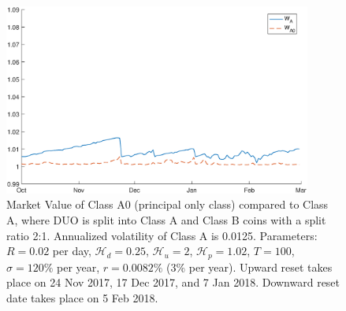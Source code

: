 \documentclass[final,pdftex]{ectaart}
\theoremstyle{plain}
\begin{document}
\begin{appendices}
\begin{figure}[htb]
\centering
\includegraphics[width=0.9\textwidth]{WA0_alpha2.eps}
\caption{Market Value of Class A0 (principal only class) compared to Class A, where DUO is split into Class A and Class B coins with a split ratio 2:1. Annualized volatility of Class A is 0.0125. Parameters: $R=0.02$ per day, $\mathcal{H}_{d}=0.25$, $\mathcal{H}_{u} =2$, $\mathcal{H}_{p}=1.02$, $T=100$, $\sigma= 120\%$ per year, $r=0.0082\%$ (3\% per year). Upward reset takes place on 24 Nov 2017, 17 Dec 2017, and 7 Jan 2018. Downward reset date takes place on 5 Feb 2018.}
\label{fig:valA0a2}
\end{figure}






\end{appendices}
\end{document}
